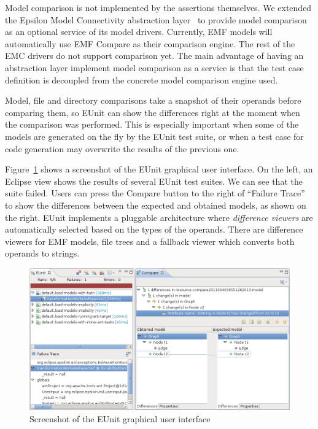 Model comparison is not implemented by the assertions themselves. We extended the Epsilon Model Connectivity abstraction layer~ to provide model comparison as an optional service of its model drivers. Currently, EMF models will automatically use EMF Compare as their comparison engine. The rest of the EMC drivers do not support comparison yet. The main advantage of having an abstraction layer implement model comparison as a service is that the test case definition is decoupled from the concrete model comparison engine used.

Model, file and directory comparisons take a snapshot of their operands before comparing them, so EUnit can show the differences right at the moment when the comparison was performed. This is especially important when some of the models are generated on the fly by the EUnit test suite, or when a test case for code generation may overwrite the results of the previous one.

Figure~\ref{fig:screenshot-eunit} shows a screenshot of the EUnit graphical user interface. On the left, an Eclipse view shows the results of several EUnit test suites. We can see that the  suite failed. Users can press the Compare button to the right of ``Failure Trace'' to show the differences between the expected and obtained models, as shown on the right. EUnit implements a pluggable architecture where \emph{difference viewers} are automatically selected based on the types of the operands. There are difference viewers for EMF models, file trees and a fallback viewer which converts both operands to strings.

\begin{figure}
  \centering
  \includegraphics[width=\textwidth]{images/EUnitUI}
  \caption{Screenshot of the EUnit graphical user interface}
  \label{fig:screenshot-eunit}
\end{figure}

